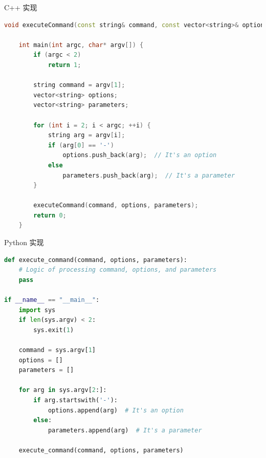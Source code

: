 \documentclass[UTF8, 16pt]{beamer}
\begin{document}
\begin{frame}[fragile]
    \textcolor{sufered}{C++ 实现}
    \begin{lstlisting}[language=c++,basicstyle=\ttfamily\scriptsize]
    void executeCommand(const string& command, const vector<string>& options, const vector<string>& parameters);
    
    int main(int argc, char* argv[]) {
        if (argc < 2)
            return 1;
        
        string command = argv[1];
        vector<string> options;
        vector<string> parameters;
        
        for (int i = 2; i < argc; ++i) {
            string arg = argv[i];
            if (arg[0] == '-')
                options.push_back(arg);  // It's an option
            else
                parameters.push_back(arg);  // It's a parameter
        }
        
        executeCommand(command, options, parameters); 
        return 0;
    }\end{lstlisting}
\end{frame}

\begin{frame}[fragile]
    \textcolor{sufered}{Python 实现}
    \begin{lstlisting}[language=python,basicstyle=\ttfamily\scriptsize]
def execute_command(command, options, parameters):
    # Logic of processing command, options, and parameters
    pass

if __name__ == "__main__":
    import sys
    if len(sys.argv) < 2:
        sys.exit(1)
    
    command = sys.argv[1]
    options = []
    parameters = []
    
    for arg in sys.argv[2:]:
        if arg.startswith('-'):
            options.append(arg)  # It's an option
        else:
            parameters.append(arg)  # It's a parameter
    
    execute_command(command, options, parameters)
\end{lstlisting}
\end{frame}


\end{document}
